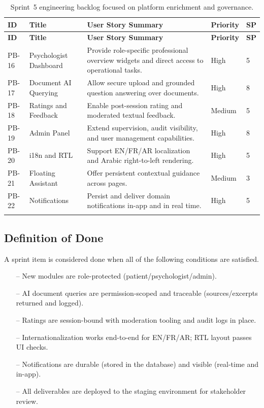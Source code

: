 \documentclass[a4paper,12pt]{report}
\begin{document}
\begin{longtable}{@{} L{0.10\textwidth} L{0.17\textwidth} L{0.45\textwidth} C{0.10\textwidth} C{0.07\textwidth} @{}}
\toprule
\textbf{ID} &
\textbf{Title} &
\textbf{User Story Summary} &
\textbf{Priority} &
\textbf{SP} \\
\midrule
\endfirsthead

\toprule
\textbf{ID} &
\textbf{Title} &
\textbf{User Story Summary} &
\textbf{Priority} &
\textbf{SP} \\
\midrule
\endhead

PB-16 & Psychologist Dashboard & Provide role-specific professional overview widgets and direct access to operational tasks. & High & 5 \\
\midrule
PB-17 & Document AI Querying & Allow secure upload and grounded question answering over documents. & High & 8 \\
\midrule
PB-18 & Ratings and Feedback & Enable post-session rating and moderated textual feedback. & Medium & 5 \\
\midrule
PB-19 & Admin Panel & Extend supervision, audit visibility, and user management capabilities. & High & 8 \\
\midrule
PB-20 & i18n and RTL & Support EN/FR/AR localization and Arabic right-to-left rendering. & High & 5 \\
\midrule
PB-21 & Floating Assistant & Offer persistent contextual guidance across pages. & Medium & 3 \\
\midrule
PB-22 & Notifications & Persist and deliver domain notifications in-app and in real time. & High & 5 \\
\bottomrule
\caption{Sprint~5 engineering backlog focused on platform enrichment and governance.}
\label{tab:sprint5-backlog}\\
\end{longtable}

\subsection{Definition of Done}

A sprint item is considered done when all of the following conditions are satisfied.

\begin{itemize}[leftmargin=*]
  \item[--] New modules are role-protected (patient/psychologist/admin).
  \item[--] AI document queries are permission-scoped and traceable (sources/excerpts returned and logged).
  \item[--] Ratings are session-bound with moderation tooling and audit logs in place.
  \item[--] Internationalization works end-to-end for EN/FR/AR; RTL layout passes UI checks.
  \item[--] Notifications are durable (stored in the database) and visible (real-time and in-app).
  \item[--] All deliverables are deployed to the staging environment for stakeholder review.
\end{itemize}
\end{document}
